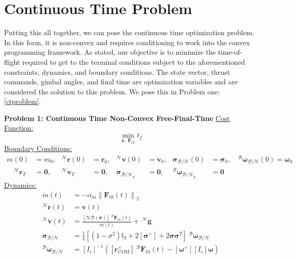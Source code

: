 \section{Continuous Time Problem}
Putting this all together, we can pose the continuous time optimization problem. In this form, it is non-convex and requires conditioning to work into the convex programming framework. As stated, our objective is to minimize the time-of-flight required to get to the terminal conditions subject to the aforementioned constraints, dynamics, and boundary conditions. The state vector, thrust commands, gimbal angles, and final time are optimization variables and are considered the solution to this problem. We pose this in Problem one: \ref{ctproblem}.
%
\clearpage
\begin{mdframed}
\label{ctproblem}
\textbf{Problem 1: Continuous Time Non-Convex Free-Final-Time}
\newline
\underline{Cost Function:}
\begin{equation*}
\min_{\mathbf{x}, \ \mathbf{F}_{th}} t_f
\end{equation*}
%
\underline{Boundary Conditions:}  
\begin{align*}
m(0) &= m_0, &^\mathcal{N}\mathbf{r}(0) &= \mathbf{r}_0, & ^\mathcal{N}\mathbf{v}(0) &= \mathbf{v}_0, & \boldsymbol{\sigma}_\mathcal{B/N}(0) &= \boldsymbol{\sigma}_0, \quad ^\mathcal{B}\boldsymbol{\omega}_\mathcal{B/N}(0) = \boldsymbol{\omega}_0 \\
\quad ^\mathcal{N}\mathbf{r}_{T} &= \mathbf{0}, & ^\mathcal{N}\mathbf{v}_T &= \mathbf{0}, & \boldsymbol{\sigma}_{\mathcal{B/N}_T} &= \mathbf{0}, & ^\mathcal{B}\boldsymbol{\omega}_{\mathcal{B/N}_{T}} &= \mathbf{0}
\end{align*}
%
\underline{Dynamics:}  
\begin{align*}
\dot{m}(t) &= -\alpha_{\dot{m}} \left\lVert \mathbf{F}_{th}(t) \right\rVert _2 \\
^\mathcal{N}\dot{\mathbf{r}}(t) &= \mathbf{v}(t) \\
^\mathcal{N}\dot{\mathbf{v}}(t) &= \frac{[\mathcal{NB}(\boldsymbol{\sigma})] \ ^\mathcal{B}\mathbf{F}_{th}(t)}{m(t)} +  \ ^\mathcal{N}\mathbf{g} \\
\dot{\boldsymbol{\sigma}}_\mathcal{B/N} &= \frac{1}{4} \left [(1-\sigma^2)\mathbb{I}_3 +  2[\boldsymbol{\sigma}^\times] + 2\boldsymbol{\sigma}\boldsymbol{\sigma}^T \right ] \ ^\mathcal{B}\boldsymbol{\omega}_\mathcal{B/N} \\
^\mathcal{B}\dot{\boldsymbol{\omega}}_\mathcal{B/N} &= [I_c]^{-1}([\boldsymbol{r}_{\text{COM}}^\times] \ ^\mathcal{B}\mathbf{F}_{th}(t) - [\boldsymbol{\omega}^\times][I_c]\boldsymbol{\omega})

\end{align*}
\end{mdframed}
